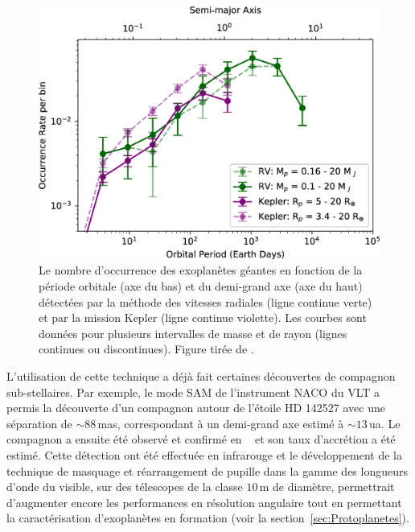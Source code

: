 \begin{figure}[ht!]
    \centering
    \includegraphics[width=\figwidth]{Figure_Chap1/Fernandes2019_Figure02.jpg}
    \caption[Le nombre d'occurrence des exoplanètes détectées par la méthode des vitesses radiales et par la mission Kepler en fonction de la période orbitale et du demi-grand axe.]{Le nombre d'occurrence des exoplanètes géantes en fonction de la période orbitale (axe du bas) et du demi-grand axe (axe du haut) détectées par la méthode des vitesses radiales (ligne continue verte) et par la mission Kepler (ligne continue violette). Les courbes sont données pour plusieurs intervalles de masse et de rayon (lignes continues ou discontinues). Figure tirée de \cite{fernandes2019}.}
    \label{fig:Fernandes2019F2}
\end{figure}

L'utilisation de cette technique a déjà fait certaines découvertes de compagnon sub-stellaires. Par exemple, le mode \ac{SAM} de l'instrument \ac{NACO} du \ac{VLT} a permis la découverte d'un compagnon autour de l'étoile HD 142527 \citep{biller2012} avec une séparation de $\sim 88 \,$mas, correspondant à un demi-grand axe estimé à $\sim 13 \,$ua. Le compagnon a ensuite été observé et confirmé en \ha~\citep{close2014} et son taux d'accrétion a été estimé. Cette détection ont été effectuée en infrarouge et le développement de la technique de masquage et réarrangement de pupille dans la gamme des longueurs d'onde du visible, sur des télescopes de la classe $10 \,$m de diamètre, permettrait d'augmenter encore les performances en résolution angulaire tout en permettant la caractérisation d'exoplanètes en formation (voir la section~\ref{sec:Protoplanetes}).


